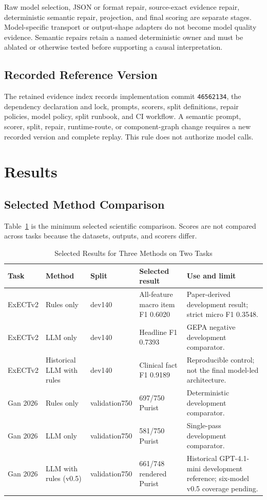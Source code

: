 \documentclass[conference]{IEEEtran}
\newcommand{\code}[1]{\texttt{#1}}
\begin{document}
Raw model selection, JSON or format repair, source-exact evidence repair,
deterministic semantic repair, projection, and final scoring are separate
stages. Model-specific transport or output-shape adapters do not become model
quality evidence. Semantic repairs retain a named deterministic owner and must
be ablated or otherwise tested before supporting a causal interpretation.

\subsection{Recorded Reference Version}

The retained evidence index records implementation commit \code{46562134}, the
dependency declaration and lock, prompts, scorers, split definitions,
repair policies, model policy, split runbook, and CI workflow. A semantic
prompt, scorer, split, repair, runtime-route, or component-graph change requires
a new recorded version and complete replay. This rule does not authorize model calls.

\section{Results}

\subsection{Selected Method Comparison}

Table~\ref{tab:reference-cells} is the minimum selected scientific comparison.
Scores are not compared across tasks because the datasets, outputs, and scorers
differ.

\begin{table}[!t]
\caption{Selected Results for Three Methods on Two Tasks}
\label{tab:reference-cells}
\centering
\scriptsize
\setlength{\tabcolsep}{2pt}
\begin{tabular}{@{}p{}p{}p{}p{}p{}@{}}
\toprule
Task & Method & Split & Selected result & Use and limit \\
\midrule
ExECTv2 & Rules only & dev140 & All-feature macro item F1 0.6020 & Paper-derived development result; strict micro F1 0.3548. \\
ExECTv2 & LLM only & dev140 & Headline F1 0.7393 & GEPA negative development comparator. \\
ExECTv2 & Historical LLM with rules & dev140 & Clinical fact F1 0.9189 & Reproducible control; not the final model-led architecture. \\
Gan 2026 & Rules only & validation750 & 697/750 Purist & Deterministic development comparator. \\
Gan 2026 & LLM only & validation750 & 581/750 Purist & Single-pass development comparator. \\
Gan 2026 & LLM with rules (v0.5) & validation750 & 661/748 rendered Purist & Historical GPT-4.1-mini development reference; six-model v0.5 coverage pending. \\
\bottomrule
\end{tabular}
\end{table}
\end{document}
